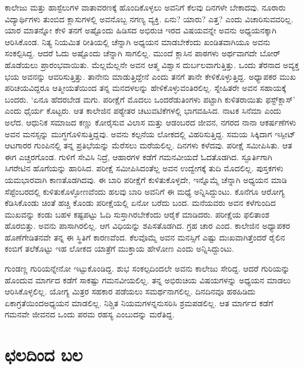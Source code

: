 ಕಾಲೇಜು ಮತ್ತು ಹಾಸ್ಟೆಲುಗಳ ವಾತಾವರಣಕ್ಕೆ ಹೊಂದಿಕೊಳ್ಳಲು ಅವನಿಗೆ ಕೆಲವು ದಿನಗಳೇ ಬೇಕಾದವು. ನೂರಾರು ವಿದ್ಯಾರ್ಥಿಗಳು ತುಂಬಿದ ಕ್ಲಾಸುಗಳಲ್ಲಿ ಅವನೊಬ್ಬ ನಗಣ್ಯ ವ್ಯಕ್ತಿ. ಏನು? ಯಾರು? ಎತ್ತ? ಎಂದು ವಿಚಾರಿಸುವವರಿಲ್ಲ. ಯಾರ ಮಾತನ್ನೋ ಕೇಳಿ ತನಗೆ ಅಷ್ಟೊಂದು ಹಿಡಿಸದ ಅಭಿರುಚಿ ಇರದ ವಿಷಯವನ್ನೇ ಅವನು ಅಧ್ಯಯನಕ್ಕಾಗಿ ಆರಿಸಿಕೊಂಡ. ನಿತ್ಯ ನಿಯಮಿತ ರೀತಿಯಲ್ಲಿ ಚೆನ್ನಾಗಿ ಅಧ್ಯಯನ ಮಾಡಬೇಕೆಂದು ಖಂಡಿತವಾಗಿಯೂ ಅವನು ಸಂಕಲ್ಪಿಸಿದ್ದ. ಆದರೆ ಓದು ಅಷ್ಟೊಂದು ಚೆನ್ನಾಗಿ ಸಾಗಲಿಲ್ಲ. ಮುಂದೆ ಕ್ಲಾಸಿನ ಪಾಠಗಳು ಅರ್ಥವಾಗದೇ ಬೋರ್ ಹೊಡೆಯಲು ಪ್ರಾರಂಭವಾಯಿತು. ಮೆಲ್ಲಮೆಲ್ಲನೇ ಅವನ ಆತ್ಮ ವಿಶ್ವಾಸ ದುರ್ಬಲವಾಗುತ್ತಿತ್ತು. ಒಂದು ತೆರನಾದ ಅವ್ಯಕ್ತ ಭಯ ಅವನನ್ನು ಆವರಿಸುತ್ತಿತ್ತು. ತಾನೇನು ಮಾಡುತ್ತಿದ್ದೇನೆ ಎಂದು ತನಗೆ ತಾನೇ ಕೇಳಿಕೊಳ್ಳುತ್ತಿದ್ದ. ಅಧ್ಯಾಪಕರ ಮುಖ ಪರಿಚಯವಿದ್ದರೂ ಆತ್ಮೀಯತೆಯಿಂದ ತನ್ನ ಮನದಳಲನ್ನು ಹೇಳಿಕೊಳ್ಳುವಂತಿರಲಿಲ್ಲ. ಸ್ನೇಹಿತರೇ ಅವನ ಸಹಾಯಕ್ಕೆ ಬಂದರು. ‘ಏನೂ ಹೆದರಬೇಡ ಮಗು. ಪರೀಕ್ಷೆಗೆ ಮೊದಲು ಒಂದರೆಡು\break ತಿಂಗಳು ಪಟ್ಟಾಗಿ ಕುಳಿತರಾಯಿತು ಫಸ್ಟ್​ಕ್ಲಾಸ್​’ ಎಂದು ಧೈರ್ಯ ಕೊಟ್ಟರು. ಆತ ಕಾಲೇಜಿನ ಪಠ್ಯೇತರ ಚಟುವಟಿಕೆಗಳಲ್ಲಿ ಭಾಗವಹಿಸಿದ. ನಾಟಕ ಸಿನೆಮಾ ಎಂದು ಅಲೆದ. ಆಧುನಿಕ ಸಮಾಜದ ಕಣ್ಣು ಕೋರೈಸುವ ವಿಲಾಸ ಮತ್ತು ಆಡಂಬರದ ಜೀವನ, ನಗರದ ನಾನಾ ಆಕರ್ಷಣೆಗಳು ಅವನ ಮನಸ್ಸನ್ನು ಮುಗ್ಧಗೊಳಿಸುತ್ತಿದ್ದವು. ಅವನು ಕಲ್ಪನೆಯ ಲೋಕದಲ್ಲಿ ವಿಹರಿಸುತ್ತಿದ್ದ. ಸಮಯ ಸಿಕ್ಕಿದಾಗ ಇಸ್ಪೀಟ್ ಆಟಗಾರರ ಗುಂಪಿನಲ್ಲಿ ತನ್ನ ಪ್ರತಿಭೆಯನ್ನು ಮೆರೆಸಲು ಮರೆಯಲಿಲ್ಲ. ದಿನಗಳು ಕಳೆದವು. ಪರೀಕ್ಷೆ ಸಮೀಪಿಸಿತು. ಆತ ಈಗ ಎಚ್ಚರಗೊಂಡ. ಗುಳಿಗೆ ಸೇವಿಸಿ ನಿದ್ರೆ, ಆಹಾರಗಳ ಕಡೆಗೆ ಗಮನವೀಯದೆ ಓದತೊಡಗಿದ. ಸ್ಫೂರ್ತಿಗಾಗಿ ಸಿಗರೇಟಿನ ಹೊಗೆಯನ್ನು ಹಾರಿಸಿದ. ಪರೀಕ್ಷೆ ಸಮೀಪಿಸಿದಂತೆಲ್ಲ ಅವನ ಉದ್ವೇಗಕ್ಕೆ ತುದಿ ಮೊದಲಿಲ್ಲ. ಪುಸ್ತಕಗಳು ಯಮಭಾರವಾಗಿ ಕಾಣತೊಡಗಿದವು. ಈ ಬಾರಿ ಪರೀಕ್ಷೆಗೆ ಕುಳಿತುಕೊಳ್ಳದೇ, ಇನ್ನೊಮ್ಮೆ ಚೆನ್ನಾಗಿ ಅಧ್ಯಯನ ಮಾಡಿ ಸೆಪ್ಟೆಂಬರದಲ್ಲಿ ಕುಳಿತುಕೊಳ್ಳೋಣವೆಂದು ಹಲವು ಬಾರಿ ಅವನಿಗೆ ಈ ಮಧ್ಯೆ ಅನ್ನಿಸಿದ್ದುಂಟು. ಕೊನೆಗೂ ಆರೋಗ್ಯ ಕೆಡಿಸಿಕೊಂಡು ಚಿಂತೆ ಹಚ್ಚಿ ಕೊಂಡು ಪರೀಕ್ಷೆಯಲ್ಲಿ ಏನೋ ಬರೆದು ಬಂದ. ಮನೆಯವರು ಅವನ ಕಳೆಗುಂದಿದ ಮುಖವನ್ನು ಕಂಡು ಬಹಳ ಕಷ್ಟಪಟ್ಟು ಓದಿ ಸುಸ್ತಾಗಿರಬೇಕೆಂದು ಆರೈಕೆ ಮಾಡಿದರು. ಪರೀಕ್ಷೆಯ ಫಲಿತಾಂಶ ಹೊರಬಿತ್ತು. ಅವನು ಪಾಸಾಗಿರಲಿಲ್ಲ. ಆಗ ವಿಧಿಯನ್ನು ಶಪಿಸತೊಡಗಿದ. ಗ್ರಹ ಚಾರ ಎಂದ. ಕಾಲೇಜಿನ ಅಧ್ಯಾಪಕರ ಹೊಣೆಗೇಡಿತನವೇ ತನ್ನ ಈ ಸ್ಥಿತಿಗೆ ಕಾರಣವೆಂದ. ಕೆಲವೊಮ್ಮೆ ಅವನ ಮನಸ್ಸಿಗೆ ಎಷ್ಟು ದುಃಖವಾಗಿತ್ತೆಂದರೆ ರೈಲಿನ ಕಂಬಿಗೆ ತಲೆಕೊಟ್ಟು ಇಹ ಲೋಕದ ಯಾತ್ರೆಗೆ ಮುಕ್ತಾಯ ಹೇಳೋಣ ಎಂದು ಅನ್ನಿಸಿದ್ದುಂಟು.

ಗುಂಡಣ್ಣ ಗುರಿಯನ್ನೇನೋ ಇಟ್ಟುಕೊಂಡಿದ್ದ. ಶುಭ ಸಂಕಲ್ಪದಿಂದಲೇ ಅವನು ಕಾಲೇಜು ಸೇರಿದ್ದ. ಆದರೆ ಗುರಿಯನ್ನು ಹೊಂದುವ ಮಾರ್ಗದ ಕಡೆಗೆ ಸಾಕಷ್ಟು ಗಮನವೀಯಲಿಲ್ಲ. ತನ್ನ ಅಭಿರುಚಿಯ ವಿಷಯಗಳನ್ನು ಅಧ್ಯಯನ ಮಾಡಲು ಆರಿಸಿಕೊಳ್ಳಲಿಲ್ಲ. ಯೋಗ್ಯ ಮಿತ್ರರ ಸಹಕಾರ ಪಡೆಯಲು ಸಮರ್ಥನಾಗಲಿಲ್ಲ. ದಿನದಿನವೂ ಹಠಹಿಡಿದು ಏಕಾಗ್ರತೆಯಿಂದ\break ಅಧ್ಯಯನ ಮಾಡಲಿಲ್ಲ. ನಿಶ್ಚಿತ ನಿಯಮಗಳನ್ನನುಸರಿಸಿ ಶ್ರಮಪಡಲಿಲ್ಲ. ಆತ ಮಾರ್ಗದ ಕಡೆಗೆ ಗಮನವೇ ಜೀವನದ ಒಂದು ಪರಮ ರಹಸ್ಯ ಎಂಬುದನ್ನು ಮರೆತಿದ್ದ.


\section*{ಛಲದಿಂದ ಬಲ}


